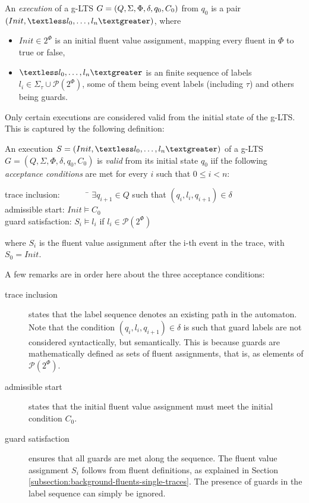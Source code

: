 \begin{definition}
An \emph{execution} of a g-LTS $G = (Q,\Sigma,\Phi,\\\delta,q_{0},C_{0})$ from $q_0$ is a pair $(Init, \textless l_0, \ldots,l_n\textgreater)$, where 
\begin{itemize}
\item $Init \in 2^\Phi$ is an initial fluent value assignment, mapping every fluent in $\Phi$ to true or false,
\item $\textless l_0,\ldots,l_n \textgreater$ is an finite sequence of labels $l_i \in \Sigma_{\tau}\cup\mathcal{P}(2^\Phi)$, some of them being event labels (including $\tau$) and others being guards.
\end{itemize}
\end{definition}

Only certain executions are considered valid from the initial state of the g-LTS. This is captured by the following definition:

\begin{definition}
An execution $S = (Init,\textless l_0,\ldots,l_n\textgreater)$ of a g-LTS $G = (Q,\Sigma,\Phi,\delta,q_{0},C_{0})$ is \emph{valid} from its initial state $q_0$ iif the following \emph{acceptance conditions} are met for every $i$ such that $0 \leqslant i < n$:\\
\vspace{-0.8cm}
\begin{tabbing}
\indent trace inclusion:~~~~~~~\= $\exists q_{i+1} \in Q$ such that $(q_i,l_i,q_{i+1}) \in \delta$\\
\indent admissible start:      \> $Init \models C_0$ \\
\indent guard satisfaction:    \> $S_i \models l_i$ if $l_i \in \mathcal{P}(2^\Phi)$\\
\end{tabbing}
\vspace{-0.8cm}
where $S_i$ is the fluent value assignment after the i-th event in the trace, with $S_0 = Init$.
\end{definition}

\noindent A few remarks are in order here about the three acceptance conditions:
\begin{description}
\item[trace inclusion] states that the label sequence denotes an existing path in the automaton. Note that the condition $(q_i,l_i,q_{i+1}) \in \delta$ is such that guard labels are not considered syntactically, but semantically. This is because guards are mathematically defined as sets of fluent assignments, that is, as elements of $\mathcal{P}(2^\Phi)$.
\item[admissible start] states that the initial fluent value assignment must meet the initial condition $C_0$.
\item[guard satisfaction] ensures that all guards are met along the sequence. The fluent value assignment $S_i$ follows from fluent definitions, as explained in Section \ref{subsection:background-fluents-single-traces}. The presence of guards in the label sequence can simply be ignored.
\end{description}

